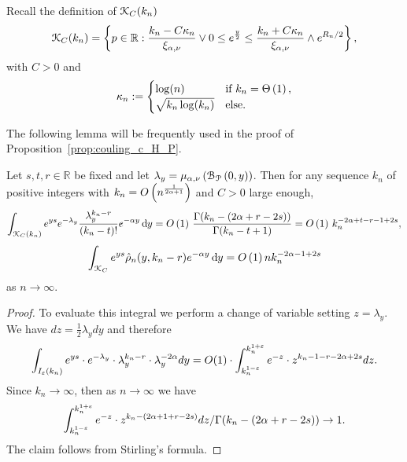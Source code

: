 Recall the definition of ${\mathcal K}_{C}(k_n)$
\[
	{\mathcal K}_C(k_n) = \left\{p \in {\ensuremath{\mathbb R}} : \frac{k_n - C \kappa_n}{\xi_{\alpha,\nu}} \vee 0 \le e^{\frac{y}{2}}
	\le \frac{k_n + C \kappa_n}{\xi_{\alpha,\nu}} \wedge e^{R_n/2} \right\},
\]
with $C > 0$ and 
\[
	\kappa_n := \begin{cases}
		\log(n) &\mbox{if } k_n = \Theta\left(1\right),\\
		\sqrt{k_n \log(k_n)} &\mbox{else.}
	\end{cases}
\]

The following lemma will be frequently used in the proof of Proposition~\ref{prop:couling_c_H_P}.

\begin{lemma} \label{lem:gamma_approx}
Let $s, t, r \in \mathbb{R}$ be fixed and let $\lambda_y = \mu_{\alpha,\nu}\left({\mathcal B}_{{\mathcal P}}\left(0,y\right)\right)$. Then for any sequence $k_n$ of positive integers with $k_n = O\left(n^{\frac{1}{2\alpha + 1}}\right)$ and $C > 0$ large enough,
\[
	\int_{{\mathcal K}_{C}(k_n)} e^{ys} e^{-\lambda_y} \frac{\lambda_y^{k_n-r}}{(k_n-t)!}e^{-\alpha y} \operatorname{\mathrm{d}\hspace{-2pt}} y =
	O\left(1\right) \, \frac{\Gamma (k_n- (2\alpha +r -2s))}{\Gamma(k_n-t+1)} = O\left(1\right) \, k_n^{-2\alpha+t-r-1+ 2s},
\]
\[
	\int_{{\mathcal K}_{C}} e^{ys} \hat{\rho}_n(y,k_n-r) e^{-\alpha y} \operatorname{\mathrm{d}\hspace{-2pt}} y = O\left(1\right) n k_n^{-2\alpha - 1 + 2s}
\]
as $n \to \infty$.
\end{lemma}
\begin{proof}
To evaluate this integral we perform a change of variable setting $z=\lambda_y$. 
We have $dz =\frac{1}{2} \lambda_y dy$ and therefore 
\begin{equation} \label{eq:gamma_approx_I}
 \int_{I_\varepsilon (k_n)} e^{ys} \cdot e^{-\lambda_y} \cdot \lambda_y^{k_n-r} \cdot \lambda_y^{-2\alpha}  dy = O(1) \cdot \int_{k_n^{1-\varepsilon}}^{k_n^{1+\varepsilon}} e^{-z} \cdot z^{k_n-1-r-2\alpha+2s}  dz. 
 \end{equation}
Since $k_n\to \infty$, then as $n\to \infty$ we have 
\begin{equation} \label{eq:gamma_approx_II}
\int_{k_n^{1-\varepsilon}}^{k_n^{1+\varepsilon}} e^{-z} \cdot z^{k_n-(2\alpha+1+r-2s)}  dz / \Gamma (k_n-(2\alpha+r -2s)) \to 1.
\end{equation}
The claim follows from Stirling's formula.
\end{proof}



